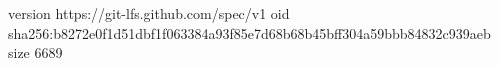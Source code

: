 version https://git-lfs.github.com/spec/v1
oid sha256:b8272e0f1d51dbf1f063384a93f85e7d68b68b45bff304a59bbb84832c939aeb
size 6689
